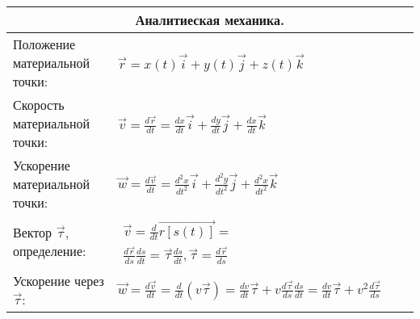 \documentclass{article}
\begin{document}
\begin{tabular}{ |p{6cm}|p{3.5cm}|p{6cm}|p{3.5cm}|  }
\hline
\multicolumn{4}{|c|}{Аналитиеская механика.} \\
\hline
Положение материальной точки:                                                &  %
$\vec{r} = x(t) \vec{i} + y(t) \vec{j} + z(t) \vec{k}$                       &  %
                                                                             &  %
                                                                             \\ %
\hline
Скорость материальной точки:                                                 &  %
$\vec{v} = \frac{d{\vec{r}}}{dt} =
\frac{dx}{dt} \vec{i} + \frac{dy}{dt} \vec{j} + \frac{dx}{dt} \vec{k}$       &  %
                                                                             &  %
                                                                             \\ %
\hline
Ускорение материальной точки:                                                &  %
$\vec{w} = \frac{d{\vec{v}}}{dt} =
\frac{d^2 x}{dt^2} \vec{i} +
\frac{d^2 y}{dt^2} \vec{j} + \frac{d^2 x}{dt^2} \vec{k}$                     &  %
                                                                             &  %
                                                                             \\ %
\hline
Вектор $\vec{\tau}$, определение:                                            &  %
$\begin{aligned}
\vec{v} = \frac{d}{dt} \vec{r[s(t)]} =                         \\
\frac{d\vec{r}}{ds} \frac{ds}{dt} = \vec{\tau} \frac{ds}{dt}, 
\vec{\tau} = \frac{d\vec{r}}{ds}
\end{aligned}$                                                               &  %
                                                                             &  %
                                                                             \\ %
\hline
Ускорение через $\vec{\tau}$:                                                &  %
$\vec{w} = \frac{d\vec{v}}{dt} =
\frac{d}{dt} (v \vec{\tau}) =
\frac{dv}{dt} \vec{\tau} + v \frac{d\vec{\tau}}{ds} \frac{ds}{dt} =
\frac{dv}{dt} \vec{\tau} + v^2 \frac{d \vec{\tau}}{ds}$                      &  %
                                                                             &  %

\end{tabular}
\end{document}
